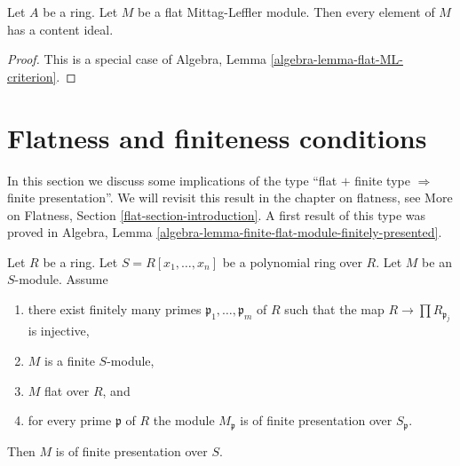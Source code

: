 \begin{lemma}
\label{lemma-content-exists-flat-Mittag-Leffler}
Let $A$ be a ring. Let $M$ be a flat Mittag-Leffler module.
Then every element of $M$ has a content ideal.
\end{lemma}

\begin{proof}
This is a special case of Algebra, Lemma \ref{algebra-lemma-flat-ML-criterion}.
\end{proof}








\section{Flatness and finiteness conditions}
\label{section-flat-finite}

\noindent
In this section we discuss some implications of the type
``flat $+$ finite type $\Rightarrow$ finite presentation''.
We will revisit this result in the chapter on flatness, see
More on Flatness, Section \ref{flat-section-introduction}.
A first result of this type was proved in
Algebra, Lemma \ref{algebra-lemma-finite-flat-module-finitely-presented}.

\begin{lemma}
\label{lemma-flat-finite-type-finite-presentation-local-module}
Let $R$ be a ring. Let $S = R[x_1, \ldots, x_n]$ be a polynomial
ring over $R$. Let $M$ be an $S$-module.
Assume
\begin{enumerate}
\item there exist finitely many primes $\mathfrak p_1, \ldots, \mathfrak p_m$
of $R$ such that the map $R \to \prod R_{\mathfrak p_j}$ is injective,
\item $M$ is a finite $S$-module,
\item $M$ flat over $R$, and
\item for every prime $\mathfrak p$ of $R$ the module $M_{\mathfrak p}$
is of finite presentation over $S_{\mathfrak p}$.
\end{enumerate}
Then $M$ is of finite presentation over $S$.
\end{lemma}

